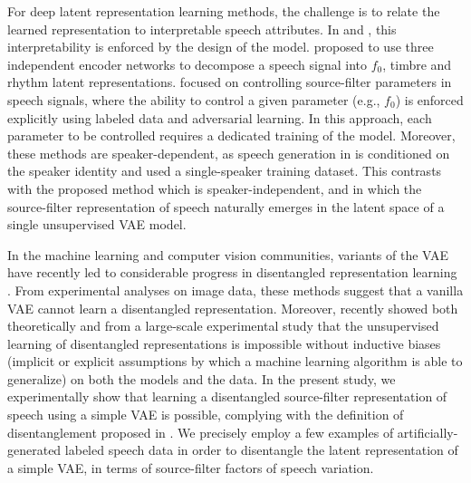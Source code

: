 \documentclass[review]{elsarticle}
\begin{document}
For deep latent representation learning methods, the challenge is to relate the learned representation to interpretable speech attributes. In \citet{qian2020unsupervised} and \citet{webber2020hider}, this interpretability is enforced by the design of the model. \citet{qian2020unsupervised} proposed to use three independent encoder networks to decompose a speech signal into $f_0$, timbre and rhythm latent representations. \citet{webber2020hider} focused on controlling source-filter parameters in speech signals, where the ability to control a given parameter (e.g., $f_0$) is enforced explicitly using labeled data and adversarial learning. In this approach, each parameter to be controlled requires a dedicated training of the model. Moreover, these methods are speaker-dependent, as speech generation in \citet{qian2020unsupervised} is conditioned on the speaker identity and \citet{webber2020hider} used a single-speaker training dataset. This contrasts with the proposed method which is speaker-independent, and in which the source-filter representation of speech naturally emerges in the latent space of a single unsupervised VAE model. 

In the machine learning and computer vision communities, variants of the VAE have recently led to considerable progress in disentangled representation learning \citep{kim2018disentangling, higgins2016beta, chen2018isolating}. From experimental analyses on image data, these methods suggest that a vanilla VAE cannot learn a disentangled representation. Moreover, \cite{locatello2019challenging, locatello2020sober} recently showed both theoretically and from a large-scale experimental study that the unsupervised learning of disentangled representations is impossible without inductive biases (implicit or explicit assumptions by which a machine learning algorithm is able to generalize) on both the models and the data. In the present study, we experimentally show that learning a disentangled source-filter representation of speech using a simple VAE is possible, complying with the definition of disentanglement proposed in \citep{higgins2018towards}. We precisely employ a few examples of artificially-generated labeled speech data in order to disentangle the latent representation of a simple VAE, in terms of source-filter factors of speech variation.
\end{document}
